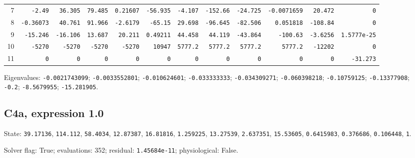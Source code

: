 \begin{landscape}
\begin{tabular}{rrrrrrrrrrrr}
7 & \texttt{-2.49} & \texttt{36.305} & \texttt{79.485} & \texttt{0.21607} & \texttt{-56.935} & \texttt{-4.107} & \texttt{-152.66} & \texttt{-24.725} & \texttt{-0.0071659} & \texttt{20.472} & \texttt{0} \\

8 & \texttt{-0.36073} & \texttt{40.761} & \texttt{91.966} & \texttt{-2.6179} & \texttt{-65.15} & \texttt{29.698} & \texttt{-96.645} & \texttt{-82.506} & \texttt{0.051818} & \texttt{-108.84} & \texttt{0} \\

9 & \texttt{-15.246} & \texttt{-16.106} & \texttt{13.687} & \texttt{20.211} & \texttt{0.49211} & \texttt{44.458} & \texttt{44.119} & \texttt{-43.864} & \texttt{-100.63} & \texttt{-3.6256} & \texttt{1.5777e-25} \\

10 & \texttt{-5270} & \texttt{-5270} & \texttt{-5270} & \texttt{-5270} & \texttt{10947} & \texttt{5777.2} & \texttt{5777.2} & \texttt{5777.2} & \texttt{5777.2} & \texttt{-12202} & \texttt{0} \\

11 & \texttt{0} & \texttt{0} & \texttt{0} & \texttt{0} & \texttt{0} & \texttt{0} & \texttt{0} & \texttt{0} & \texttt{0} & \texttt{0} & \texttt{-31.273} \\

\bottomrule\end{tabular}\par\endgroup

{\scriptsize Eigenvalues: \texttt{-0.0021743099}; \texttt{-0.0033552801}; \texttt{-0.010624601}; \texttt{-0.033333333}; \texttt{-0.034309271}; \texttt{-0.060398218}; \texttt{-0.10759125}; \texttt{-0.13377908}; \texttt{-0.2}; \texttt{-8.5679955}; \texttt{-15.281905}.\par}

\clearpage
\subsection*{C4a, expression 1.0}
{\scriptsize State: \texttt{39.17136}, \texttt{114.112}, \texttt{58.4034}, \texttt{12.87387}, \texttt{16.81816}, \texttt{1.259225}, \texttt{13.27539}, \texttt{2.637351}, \texttt{15.53605}, \texttt{0.6415983}, \texttt{0.376686}, \texttt{0.106448}, \texttt{1}.\par

Solver flag: True; evaluations: 352; residual: \texttt{1.45684e-11}; physiological: False.\par}


\end{landscape}
